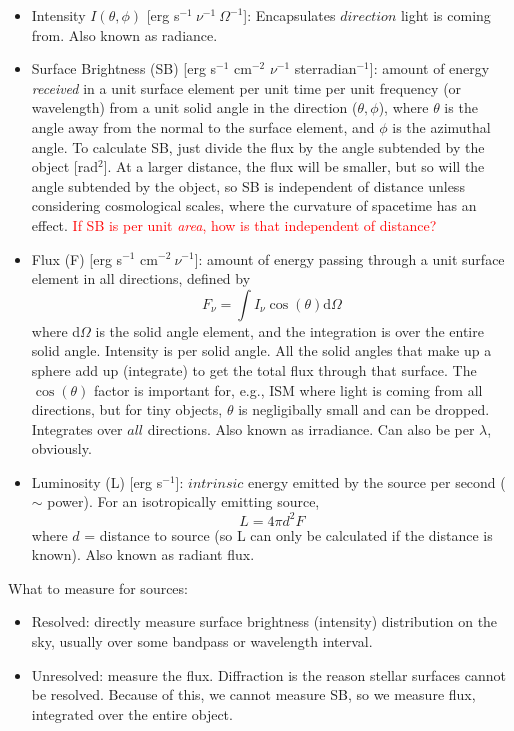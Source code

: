 \documentclass[12pt]{article}
\begin{document}
\begin{itemize}
    \item Intensity $I(\theta,\phi)$ [erg s$^{-1}\ \nu^{-1}\ \Omega^{-1}$]:
        Encapsulates $direction$ light is coming from.
        Also known as radiance.
    \item Surface Brightness (SB)
        [erg s$^{-1}$ cm$^{-2}$ $\nu^{-1}$ sterradian$^{-1}$]:
        amount of energy \emph{received} in a unit surface
        element per unit time per unit frequency (or wavelength)
        from a unit
        solid angle in the direction ($\theta,\phi$), where $\theta$
        is the angle
        away from the normal to the surface element, and $\phi$ is the
        azimuthal angle.
        To calculate SB, just divide the flux by the angle subtended
        by the object [rad$^2$]. At a larger distance, the flux will
        be smaller, but so will the angle subtended by the object, so
        SB is independent of distance unless considering cosmological
        scales, where the curvature of spacetime has an effect.
        \textcolor{red}{If SB is per unit \emph{area}, how is that
        independent of distance?}
    \item Flux (F) [erg s$^{-1}$ cm$^{-2}\ \nu^{-1}$]:
        amount of energy passing through a unit surface element
        in all directions, defined by
        \begin{equation}
            F_{\nu} = \int I_{\nu}\cos(\theta)\textrm{d}\Omega
        \end{equation}
        where d$\Omega$ is the solid angle element, and the integration is
        over the entire solid angle. Intensity is per solid angle. All
        the solid angles that make up a sphere add up (integrate) to
        get the total flux through that surface.
        The $\cos(\theta)$ factor is important
        for, e.g., ISM where light is coming from all directions, but for
        tiny objects, $\theta$ is negligibally small and can be dropped.
        Integrates over $all$ directions.
        Also known as irradiance. Can also be per $\lambda$, obviously.
    \item Luminosity (L) [erg s$^{-1}$]:
        $intrinsic$ energy emitted by the source per
        second ($\sim$ power). For an isotropically emitting source,
        \begin{equation}
            L = 4 \pi d^2 F
        \end{equation}
        where $d$ = distance to source (so L can only be calculated if
        the distance is known). Also known as radiant flux.
\end{itemize}
What to measure for sources:
\begin{itemize}
    \item Resolved: directly measure surface brightness (intensity)
        distribution on the sky, usually over some bandpass or wavelength
        interval.
    \item Unresolved: measure the flux. Diffraction is the reason stellar
        surfaces cannot be resolved. Because of this, we cannot measure
        SB, so we measure flux, integrated over the entire object.
\end{itemize}
\end{document}
